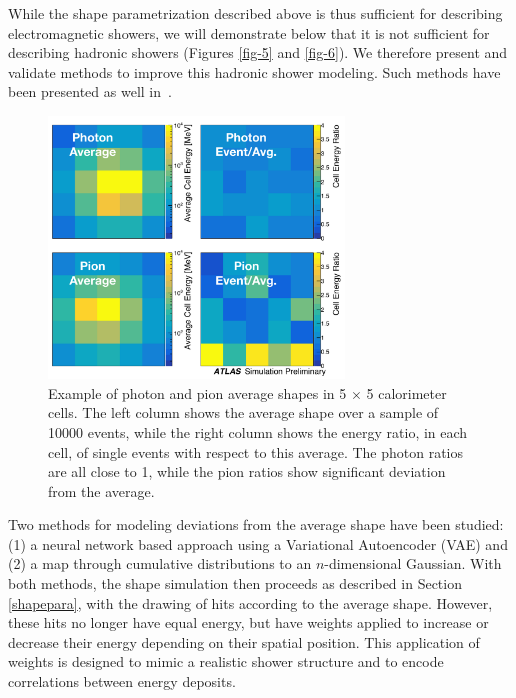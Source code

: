 While the shape parametrization described above is thus sufficient for describing electromagnetic showers, we will demonstrate below that it is not sufficient for describing hadronic showers (Figures \ref{fig-5} and \ref{fig-6}). We therefore present and validate methods to improve this hadronic shower modeling. Such methods have been presented as well in~\cite{CHEP-proceedings}.

\begin{figure}[ht!]
\centering
\includegraphics[width=0.7\textwidth]{figures/approved-example-pion-photon-ave-ratios-ATLASstyle.pdf}
\caption{Example of photon and pion average shapes in 5 $\times$ 5 calorimeter cells. The left column shows the average shape over a sample of 10000 events, while the right column shows the energy ratio, in each cell, of single \GEANT events with respect to this average. The photon ratios are all close to 1, while the pion ratios show significant deviation from the average.}
\label{fig-2}
\end{figure}

Two methods for modeling deviations from the average shape have been studied: 
(1) a neural network based approach using a Variational 
Autoencoder (VAE) \cite{VAE} and (2) a map through cumulative distributions to an $n$-dimensional Gaussian. 
With both methods, the shape simulation then proceeds as described in Section \ref{shapepara}, with the drawing of hits 
according to the average shape. However, these hits no longer have equal energy, but have weights applied to increase or 
decrease their energy depending on their spatial position. This application of weights is designed to mimic a realistic 
shower structure and to encode correlations between energy deposits.

